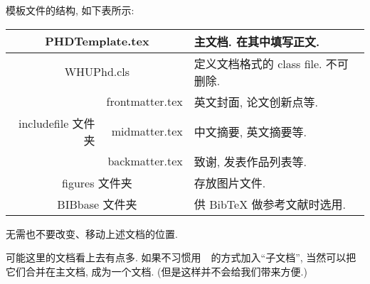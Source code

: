 \documentclass{ice_report}  %
\begin{document}
模板文件的结构, 如下表所示:
 \begin{table}[ht]\centering
\begin{tabular}{r|r|l}
\hline\hline
  \multicolumn{2}{c|}{PHDTemplate.tex }  &  主文档. 在其中填写正文.\\\hline
  \multicolumn{2}{c|}{WHUPhd.cls} &  定义文档格式的 class file. 不可删除.\\\hline
                          &frontmatter.tex&  英文封面, 论文创新点等. \\\cline{2-3}
 includefile 文件夹  & midmatter.tex  &  中文摘要, 英文摘要等.  \\\cline{2-3}
                            & backmatter.tex &  致谢, 发表作品列表等.  \\\hline
  \multicolumn{2}{c|}{figures 文件夹} &  存放图片文件.\\\hline
  \multicolumn{2}{c|}{BIBbase 文件夹} &   供 BibTeX{} 做参考文献时选用.\\
\hline\hline
\end{tabular}
\end{table}

无需也不要改变、移动上述文档的位置.

可能这里的文档看上去有点多. 如果不习惯用~\verb||~的方式加入``子文档'', 当然可以把它们合并在主文档, 成为一个文档.
({\kaishu 但是这样并不会给我们带来方便.})

\end{document}
